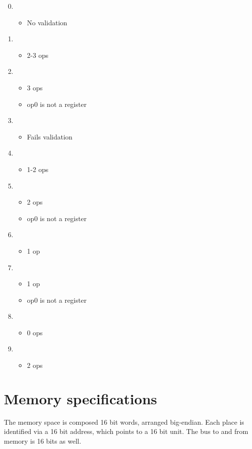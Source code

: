 \documentclass[12pt]{article}
\begin{document}
\begin{enumerate}
\setcounter{enumi}{-1}
\item \begin{itemize} \item No validation \end{itemize}
\item \begin{itemize} \item 2-3 ops \end{itemize}
\item \begin{itemize}
    \item 3 ops
    \item op0 is not a register
    \end{itemize}
\item \begin {itemize} \item Fails validation \end{itemize}
\item \begin {itemize} \item 1-2 ops \end{itemize}
\item \begin {itemize}
     \item 2 ops
     \item op0 is not a register
     \end{itemize}
\item \begin{itemize} \item 1 op \end{itemize}
\item \begin{itemize}
        \item 1 op
        \item op0 is not a register
      \end{itemize}
\item \begin {itemize} \item 0 ops \end{itemize}
\item \begin {itemize} \item 2 ops \end{itemize}
\end{enumerate}

\section{Memory specifications}
The memory space is composed 16 bit words, arranged big-endian.
Each place is identified via a 16 bit address, which points to a 16 bit unit.
The bus to and from memory is 16 bits as well.
\end{document}
